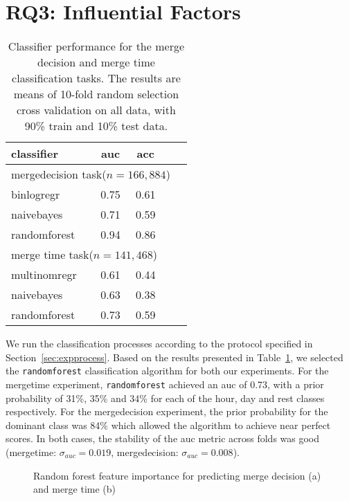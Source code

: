 \documentclass{sig-alternate}
\begin{document}
\section{RQ3: Influential Factors}
\label{sec:accrej}

\begin{table}
  \centering
  \begin{tabular}{lcccc}
    \hline
    {\bf classifier} & {\sc auc} & {\sc acc} \\
    \hline
    \multicolumn{4}{l}{\textsf{mergedecision} task($n = 166,884$)} \\
    binlogregr    & 0.75 & 0.61  \\
    naivebayes    & 0.71 & 0.59  \\
    randomforest  & 0.94 & 0.86  \\
    \hline
    \multicolumn{4}{l}{\textsf{merge time} task($n = 141,468$)} \\
    multinomregr  & 0.61 & 0.44  \\
    naivebayes    & 0.63 & 0.38  \\
    randomforest  & 0.73 & 0.59  \\
    \hline
  \end{tabular}
  \caption{Classifier performance for the merge decision and merge time
  classification tasks. The results are means of 10-fold random selection
  cross validation on all data, with 90\% train and 10\% test data.}
  \label{tab:classif-perf}
\end{table}

We run the classification processes according to the protocol specified in
Section~\ref{sec:expprocess}.  Based on the results presented in
Table~\ref{tab:classif-perf}, we selected the \texttt{randomforest}
classification algorithm for both our experiments. For the \textsf{mergetime}
experiment, \texttt{randomforest} achieved an {\sc auc} of 0.73, with a prior
probability of 31\%, 35\% and 34\% for each of the \textsf{hour}, \textsf{day}
and \textsf{rest} classes respectively. For the \textsf{mergedecision}
experiment, the prior probability for the dominant class was 84\% which allowed
the algorithm to achieve near perfect scores. In both cases, the stability of
the {\sc auc} metric across folds was good (\textsf{mergetime}: $\sigma_{auc} =
0.019$, \textsf{mergedecision}: $\sigma_{auc} = 0.008$).

\begin{figure*}
\centering
{}
\caption{Random forest feature importance for predicting merge decision (a) and merge time (b)}
\label{fig:varimp}
\end{figure*}
\end{document}
